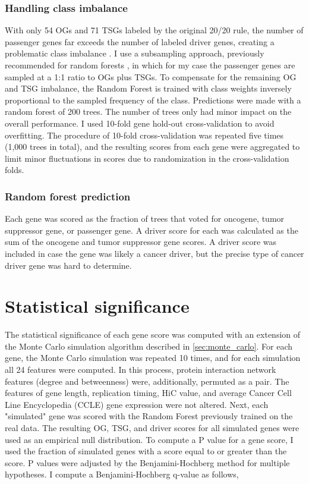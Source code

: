 \subsubsection{Handling class imbalance}

With only 54 OGs and 71 TSGs labeled by the original 20/20 rule, the number of passenger genes far exceeds the number of labeled driver genes, creating a problematic class imbalance \cite{RN93}. I use a subsampling approach, previously recommended for random forests \cite{RN92}, in which for my case the passenger genes are sampled at a 1:1 ratio to OGs plus TSGs. To compensate for the remaining OG and TSG imbalance, the Random Forest is trained with class weights inversely proportional to the sampled frequency of the class. Predictions were made with a random forest of 200 trees. The number of trees only had minor impact on the overall performance. I used 10-fold gene hold-out cross-validation to avoid overfitting. The procedure of 10-fold cross-validation was repeated five times (1,000 trees in total), and the resulting scores from each gene were aggregated to limit minor fluctuations in scores due to randomization in the cross-validation folds.

\subsubsection{Random forest prediction}

Each gene was scored as the fraction of trees that voted for oncogene, tumor suppressor gene, or passenger gene. A driver score for each was calculated as the sum of the oncogene and tumor suppressor gene scores. A driver score was included in case the gene was likely a cancer driver, but the precise type of cancer driver gene was hard to determine.

\section{Statistical significance}

The statistical significance of each gene score was computed with an extension of the Monte Carlo simulation algorithm described in \autoref{sec:monte_carlo}. For each gene, the Monte Carlo simulation was repeated 10 times, and for each simulation all 24 features were computed. In this process, protein interaction network features (degree and betweenness) were, additionally, permuted as a pair. The features of gene length, replication timing, HiC value, and average Cancer Cell Line Encyclopedia (CCLE) gene expression were not altered. Next, each "simulated" gene was scored with the Random Forest previously trained on the real data. The resulting OG, TSG, and driver scores for all simulated genes were used as an empirical null distribution. To compute a P value for a gene score, I used the fraction of simulated genes with a score equal to or greater than the score. P values were adjusted by the Benjamini-Hochberg method \cite{RN94} for multiple hypotheses. I compute a Benjamini-Hochberg q-value as follows,

